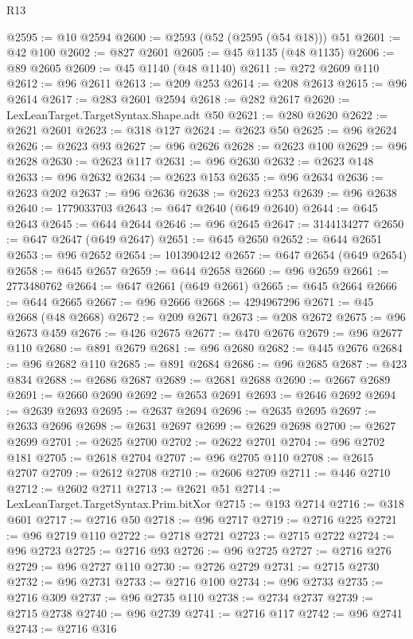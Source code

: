 \begin{lexlean}{R13}
\begin{coremodule}
{{{{{{{{{{{{{{{{{{{{{{{{{{{{{{{{{{{{{{{{{{{{{{{{{{{{{{{{{{{{{{{{{{{{{{{{{{{{{{{{{{{{{{{{{{{{{{{{{{{{{{{{{{@2595 := @10 @2594
@2600 := @2593 (@52 (@2595 (@54 @18))) @51
@2601 := @42 @100
@2602 := @827 @2601
@2605 := @45 @1135 (@48 @1135)
@2606 := @89 @2605
@2609 := @45 @1140 (@48 @1140)
@2611 := @272 @2609 @110
@2612 := @96 @2611
@2613 := @209 @253
@2614 := @208 @2613
@2615 := @96 @2614
@2617 := @283 @2601 @2594
@2618 := @282 @2617
@2620 := LexLeanTarget.TargetSyntax.Shape.adt @50
@2621 := @280 @2620
@2622 := @2621 @2601
@2623 := @318 @127
@2624 := @2623 @50
@2625 := @96 @2624
@2626 := @2623 @93
@2627 := @96 @2626
@2628 := @2623 @100
@2629 := @96 @2628
@2630 := @2623 @117
@2631 := @96 @2630
@2632 := @2623 @148
@2633 := @96 @2632
@2634 := @2623 @153
@2635 := @96 @2634
@2636 := @2623 @202
@2637 := @96 @2636
@2638 := @2623 @253
@2639 := @96 @2638
@2640 := 1779033703
@2643 := @647 @2640 (@649 @2640)
@2644 := @645 @2643
@2645 := @644 @2644
@2646 := @96 @2645
@2647 := 3144134277
@2650 := @647 @2647 (@649 @2647)
@2651 := @645 @2650
@2652 := @644 @2651
@2653 := @96 @2652
@2654 := 1013904242
@2657 := @647 @2654 (@649 @2654)
@2658 := @645 @2657
@2659 := @644 @2658
@2660 := @96 @2659
@2661 := 2773480762
@2664 := @647 @2661 (@649 @2661)
@2665 := @645 @2664
@2666 := @644 @2665
@2667 := @96 @2666
@2668 := 4294967296
@2671 := @45 @2668 (@48 @2668)
@2672 := @209 @2671
@2673 := @208 @2672
@2675 := @96 @2673 @459
@2676 := @426 @2675
@2677 := @470 @2676
@2679 := @96 @2677 @110
@2680 := @891 @2679
@2681 := @96 @2680
@2682 := @445 @2676
@2684 := @96 @2682 @110
@2685 := @891 @2684
@2686 := @96 @2685
@2687 := @423 @834
@2688 := @2686 @2687
@2689 := @2681 @2688
@2690 := @2667 @2689
@2691 := @2660 @2690
@2692 := @2653 @2691
@2693 := @2646 @2692
@2694 := @2639 @2693
@2695 := @2637 @2694
@2696 := @2635 @2695
@2697 := @2633 @2696
@2698 := @2631 @2697
@2699 := @2629 @2698
@2700 := @2627 @2699
@2701 := @2625 @2700
@2702 := @2622 @2701
@2704 := @96 @2702 @181
@2705 := @2618 @2704
@2707 := @96 @2705 @110
@2708 := @2615 @2707
@2709 := @2612 @2708
@2710 := @2606 @2709
@2711 := @446 @2710
@2712 := @2602 @2711
@2713 := @2621 @51
@2714 := LexLeanTarget.TargetSyntax.Prim.bitXor
@2715 := @193 @2714
@2716 := @318 @601
@2717 := @2716 @50
@2718 := @96 @2717
@2719 := @2716 @225
@2721 := @96 @2719 @110
@2722 := @2718 @2721
@2723 := @2715 @2722
@2724 := @96 @2723
@2725 := @2716 @93
@2726 := @96 @2725
@2727 := @2716 @276
@2729 := @96 @2727 @110
@2730 := @2726 @2729
@2731 := @2715 @2730
@2732 := @96 @2731
@2733 := @2716 @100
@2734 := @96 @2733
@2735 := @2716 @309
@2737 := @96 @2735 @110
@2738 := @2734 @2737
@2739 := @2715 @2738
@2740 := @96 @2739
@2741 := @2716 @117
@2742 := @96 @2741
@2743 := @2716 @316
}}}}}}}}}}}}}}}}}}}}}}}}}}}}}}}}}}}}}}}}}}}}}}}}}}}}}}}}}}}}}}}}}}}}}}}}}}}}}}}}}}}}}}}}}}}}}}}}}}}}}}}}}}
\end{coremodule}
\end{lexlean}
